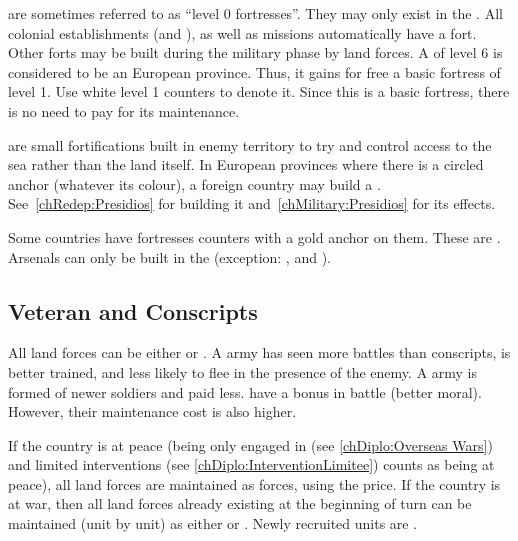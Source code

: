 \aparag[Forts] are sometimes referred to as ``level 0 fortresses''. They may
only exist in the \ROTW.
\bparag All colonial establishments (\COL and \TP), as well as missions
automatically have a fort.
\bparag Other forts may be built during the military phase by land forces.
\bparag A \COL of level 6 is considered to be an European province. Thus, it
gains for free a basic fortress of level 1. Use white level 1 counters to
denote it. Since this is a basic fortress, there is no need to pay for its
maintenance.

\aparag[\Presidios] are small fortifications built in enemy territory to try
and control access to the sea rather than the land itself.
\bparag In European provinces where there is a circled anchor (whatever its
colour), a foreign country may build a
\Presidio. See~\ref{chRedep:Presidios} for building it
and~\ref{chMilitary:Presidios} for its effects.

\aparag[Arsenals.] Some countries have fortresses counters with a gold anchor
on them. These are .
\bparag Arsenals can only be built in the \ROTW (exception:
,  and
).

\subsection{Veteran and Conscripts}
\label{chMilitary:Veteran Conscripts}

 All land forces can be either
 or . A  army has seen more
battles than conscripts, is better trained, and less likely to flee in the
presence of the enemy. A  army is formed of newer soldiers
and paid less.
\bparag {} have a bonus in battle (better moral). However, their
maintenance cost is also higher.

 If the country is at peace (being only engaged in
 (see \ref{chDiplo:Overseas Wars}) and limited
interventions (see \ref{chDiplo:InterventionLimitee}) counts as being at
peace), all land forces are maintained as  forces, using the
 price.
\bparag If the country is at war, then all land forces already existing at the
beginning of turn can be maintained (unit by unit) as either 
or . Newly recruited units are .

